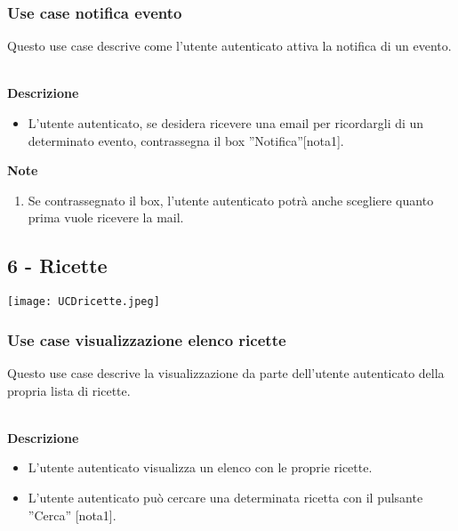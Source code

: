 \documentclass[a4paper,12pt]{article}
\begin{document}
\subsubsection*{Use case notifica evento}

Questo use case descrive come l'utente autenticato attiva la notifica di un evento.

\textbf{\\Descrizione}
\begin{itemize} \setlength\itemsep{0.01em}
\item L'utente autenticato, se desidera ricevere una email per ricordargli di un determinato evento, contrassegna il box ''Notifica''[nota1].
\end{itemize}

\textbf{Note}
\begin{enumerate} \setlength\itemsep{0.01em}
\item Se contrassegnato il box, l'utente autenticato potrà anche scegliere quanto prima vuole ricevere la mail.
\end{enumerate}







\subsection*{6 - Ricette }

\begin{center}
  \texttt{[image: UCDricette.jpeg]}
\end{center}

\subsubsection*{Use case visualizzazione elenco ricette}

Questo use case descrive la visualizzazione da parte dell'utente autenticato della propria lista di ricette.

\textbf{\\Descrizione}
\begin{itemize} \setlength\itemsep{0.01em}
\item L'utente autenticato visualizza un elenco con le proprie ricette.
\item L'utente autenticato può cercare una determinata ricetta con il pulsante ''Cerca'' [nota1].
\end{itemize}
\end{document}
